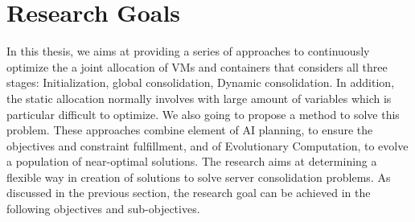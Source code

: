\section{Research Goals}
In this thesis, we aims at providing a series of approaches to continuously optimize the a joint allocation of VMs and containers that considers all three stages: Initialization, global consolidation, Dynamic consolidation. In addition, the static allocation normally involves with large amount of variables which is particular difficult to optimize. We also going to propose a method to solve this problem.  These approaches combine element of AI planning, to ensure the objectives and constraint fulfillment, and of Evolutionary Computation, to evolve a population of near-optimal solutions. The research aims at determining a flexible way in creation of solutions to solve server consolidation problems. As discussed in the previous section, the research goal can be achieved in the following objectives and sub-objectives.


